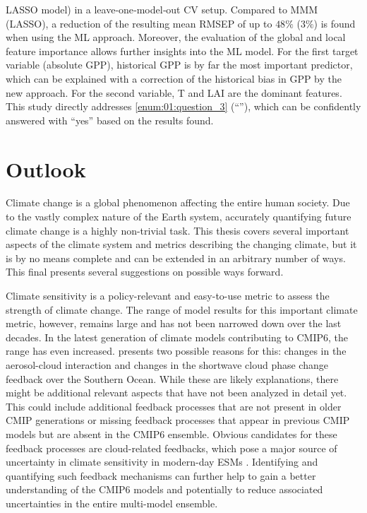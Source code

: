 \ac{LASSO} model) in a leave‐one‐model‐out \ac{CV} setup. Compared to \ac{MMM}
(\ac{LASSO}), a reduction of the resulting mean \ac{RMSEP} of up to $48
\unit{\%}$ ($3 \unit{\%}$) is found when using the \ac{ML} approach. Moreover,
the evaluation of the global and local feature importance allows further
insights into the \ac{ML} model. For the first target variable (absolute
\ac{GPP}), historical \ac{GPP} is by far the most important predictor, which
can be explained with a correction of the historical bias in \ac{GPP} by the
new approach. For the second variable, \ac{T} and \ac{LAI} are the dominant
features. This study directly addresses \cref{enum:01:question_3}
(\enquote{\emph{\KeyScienceQuestionThree{}}}), which can be confidently
answered with \enquote{yes} based on the results found.


\section{Outlook}
\label{sec:07:outlook}

Climate change is a global phenomenon affecting the entire human society. Due
to the vastly complex nature of the Earth system, accurately quantifying future
climate change is a highly non-trivial task. This thesis covers several
important aspects of the climate system and metrics describing the changing
climate, but it is by no means complete and can be extended in an arbitrary
number of ways. This final  presents several
suggestions on possible ways forward.

Climate sensitivity is a policy-relevant and easy-to-use metric to assess the
strength of climate change. The range of model results for this important
climate metric, however, remains large and has not been narrowed down over the
last decades. In the latest generation of climate models contributing to
\acs{CMIP}6, the range has even increased.
 presents two possible reasons for this:
changes in the aerosol-cloud interaction and changes in the shortwave cloud
phase change feedback over the Southern Ocean. While these are likely
explanations, there might be additional relevant aspects that have not been
analyzed in detail yet. This could include additional feedback processes that
are not present in older \ac{CMIP} generations or missing feedback processes
that appear in previous \ac{CMIP} models but are absent in the \acs{CMIP}6
ensemble. Obvious candidates for these feedback processes are cloud-related
feedbacks, which pose a major source of uncertainty in climate sensitivity in
modern-day \acp{ESM} \autocite{Boucher2013}. Identifying and quantifying such
feedback mechanisms can further help to gain a better understanding of the
\acs{CMIP}6 models and potentially to reduce associated uncertainties in the
entire multi-model ensemble.

